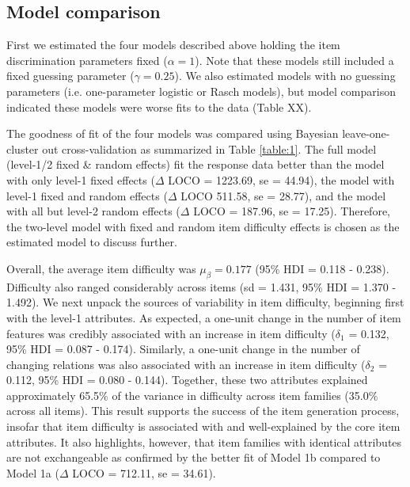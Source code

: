 \documentclass[a4paper,man,natbib]{apa6}
\begin{document}
\subsection{Model comparison}

First we estimated the four models described above holding the item discrimination parameters fixed ($\alpha = 1$).  Note that these models still included a fixed guessing parameter ($\gamma = 0.25$). We also estimated models with no guessing parameters (i.e. one-parameter logistic or Rasch models), but model comparison indicated these models were worse fits to the data (Table XX).

The goodness of fit of the four models was compared using Bayesian leave-one-cluster out cross-validation as summarized in Table \ref{table:1}. The full model (level-1/2 fixed \& random effects) fit the response data better than the model with only level-1 fixed effects ($\Delta$ LOCO = 1223.69, se = 44.94), the model with level-1 fixed and random effects ($\Delta$ LOCO 511.58, se = 28.77), and the model with all but level-2 random effects ($\Delta$ LOCO = 187.96, se = 17.25). Therefore, the two-level model with fixed and random item difficulty effects is chosen as the estimated model to discuss further. 

Overall, the average item difficulty was $\mu_\beta = 0.177$ (95\% HDI = 0.118 - 0.238). Difficulty also ranged considerably across items (sd = 1.431, 95\% HDI = 1.370 - 1.492). We next unpack the sources of variability in item difficulty, beginning first with the level-1 attributes. As expected, a one-unit change in the number of item features was credibly associated with an increase in item difficulty ($\delta_1$ = 0.132, 95\% HDI = 0.087 - 0.174). Similarly, a one-unit change in the number of changing relations was also associated with an increase in item difficulty ($\delta_2$ = 0.112, 95\% HDI = 0.080 - 0.144). Together, these two attributes explained approximately 65.5\% of the variance in difficulty across item families (35.0\% across all items). This result supports the success of the item generation process, insofar that item difficulty is associated with and well-explained by the core item attributes. It also highlights, however, that item families with identical attributes are not exchangeable as confirmed by the better fit of Model 1b compared to Model 1a ($\Delta$ LOCO = 712.11, se = 34.61).
\end{document}

